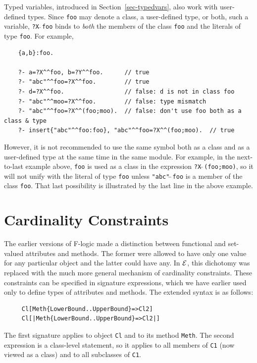 \documentclass[11pt]{article}
\newcommand{\ERGO}{\mbox{\ensuremath{\cal{E}}\smaller{{\sc{RGO}}}}\xspace}
\newcommand{\FLSYSTEM}{\ERGO}
\begin{document}
Typed variables, introduced in Section~\ref{sec-typedvars}, also work with
user-defined types. Since \texttt{foo} may denote a class, a user-defined
type, or both, such a variable, \texttt{?X$\hat{~}\hat{~}$foo} binds to
\emph{both} the members of the class \texttt{foo} and the literals of type
\texttt{foo}. For example,
\begin{verbatim}
    {a,b}:foo.

    ?- a=?X^^foo, b=?Y^^foo.      // true
    ?- "abc"^^foo=?X^^foo.        // true
    ?- d=?X^^foo.                 // false: d is not in class foo
    ?- "abc"^^moo=?X^^foo.        // false: type mismatch
    ?- "abc"^^foo=?X^^(foo;moo).  // false: don't use foo both as a class & type
    ?- insert{"abc"^^foo:foo}, "abc"^^foo=?X^^(foo;moo).  // true
\end{verbatim}
However, it is not recommended to use the same symbol both as a class and
as a user-defined type at the same time in the same module. For example, in
the next-to-last example above, \texttt{foo} is used as a class in the
expression \texttt{?X$\hat{~}\hat{~}$(foo;moo)}, so it will not unify with the literal of type
\texttt{foo} unless \texttt{"abc"$\hat{~}\hat{~}$foo} is a member of the
class \texttt{foo}. That last possibility is illustrated by the last line
in the above example.  





\section{Cardinality Constraints}\label{sec-card-in-signatures}

The earlier versions of F-logic made a distinction between functional and
set-valued attributes and methods. The former were allowed to have only one
value for any particular object and the latter could have any. In \FLSYSTEM,
this dichotomy was replaced with the much more general mechanism of
cardinality constraints. These constraints can be specified in signature
expressions, which we have earlier used only to define types of attributes
and methods. The extended syntax is as follows:
\begin{verbatim}
     Cl[Meth{LowerBound..UpperBound}=>Cl2]
     Cl[|Meth{LowerBound..UpperBound}=>Cl2|]
\end{verbatim}
The first signature applies to object {\tt Cl} and to its 
method {\tt Meth}. The second expression is a class-level statement, so it
applies to all members of \texttt{C1} (now viewed as a class) and to all
subclasses of \texttt{C1}.  
\end{document}
